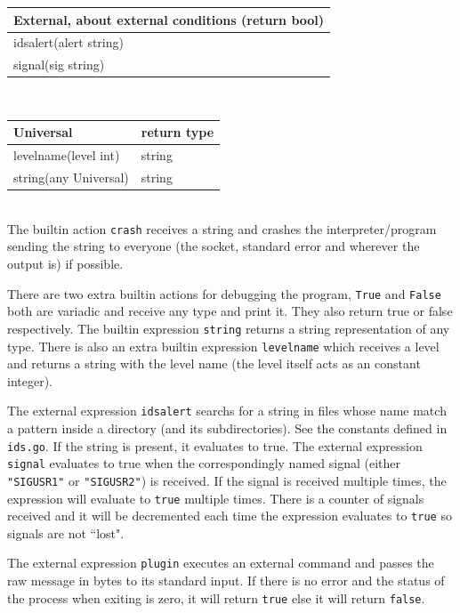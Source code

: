 \documentclass[a4paper]{article}
\begin{document}
\begin{tabular}{l}
\\
 External, about external conditions (return bool)\\
\hline
	idsalert(alert string)\\
	signal(sig string)\\
\end{tabular}
\\

\begin{tabular}{ll}
\\
 Universal& return type\\
\hline
	levelname(level int) & string\\
	string(any Universal) & string\\
\end{tabular}
\\

The builtin action \texttt{crash} receives a string and crashes the interpreter/program
sending the string to everyone (the socket, standard error and wherever the
output is) if possible.

There are two extra builtin actions for debugging the program, \texttt{True} and \texttt{False}
both are variadic and receive any type and print it. They also return true or false
respectively.
The builtin expression \texttt{string} returns a string representation of any type.
There is also an extra builtin expression \texttt{levelname} which receives a level and returns
a string with the level name (the level itself acts as an constant integer).

The external expression \texttt{idsalert} searchs for a string in files whose name match a pattern
inside a directory (and its subdirectories). See the constants defined in \verb+ids.go+. If the
string is present, it evaluates to true.
The external expression \texttt{signal} evaluates to true when the correspondingly named
signal (either \texttt{"SIGUSR1"} or \texttt{"SIGUSR2"}) is received. If the signal is received
multiple times, the expression will evaluate to \texttt{true} multiple times. There is a counter of
signals received and it will be decremented each time
the expression evaluates to \texttt{true} so signals are not ``lost".

The external expression \texttt{plugin} executes an external command and passes
the raw message in bytes to its standard input. If there is no error and the status of the
process when exiting is zero, it will return \verb+true+ else it will return \verb+false+.
\end{document}

